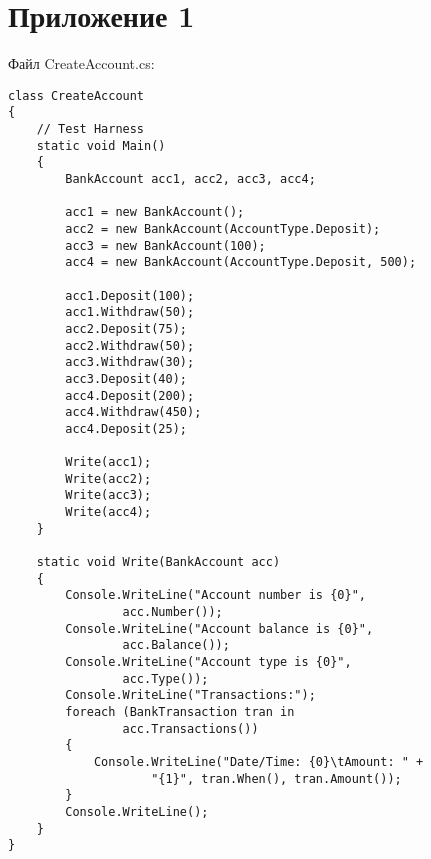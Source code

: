 \chapter*{Приложение 1}

Файл CreateAccount.cs:
\begin{lstlisting}[style=CSharpStyle]
class CreateAccount
{
    // Test Harness
    static void Main() 
    {
		BankAccount acc1, acc2, acc3, acc4;

		acc1 = new BankAccount();
		acc2 = new BankAccount(AccountType.Deposit);
		acc3 = new BankAccount(100);
		acc4 = new BankAccount(AccountType.Deposit, 500);

		acc1.Deposit(100);
		acc1.Withdraw(50);
		acc2.Deposit(75);
		acc2.Withdraw(50);
        acc3.Withdraw(30);
		acc3.Deposit(40);
		acc4.Deposit(200);
		acc4.Withdraw(450);
		acc4.Deposit(25);

		Write(acc1);
		Write(acc2);
		Write(acc3);
		Write(acc4);
    }
      
    static void Write(BankAccount acc)
    {
        Console.WriteLine("Account number is {0}",
                acc.Number());
        Console.WriteLine("Account balance is {0}", 
                acc.Balance());
        Console.WriteLine("Account type is {0}",
                acc.Type());
		Console.WriteLine("Transactions:");
		foreach (BankTransaction tran in 
                acc.Transactions()) 
		{
			Console.WriteLine("Date/Time: {0}\tAmount: " +
                    "{1}", tran.When(), tran.Amount());
		}
		Console.WriteLine();
    }
}
\end{lstlisting}  

